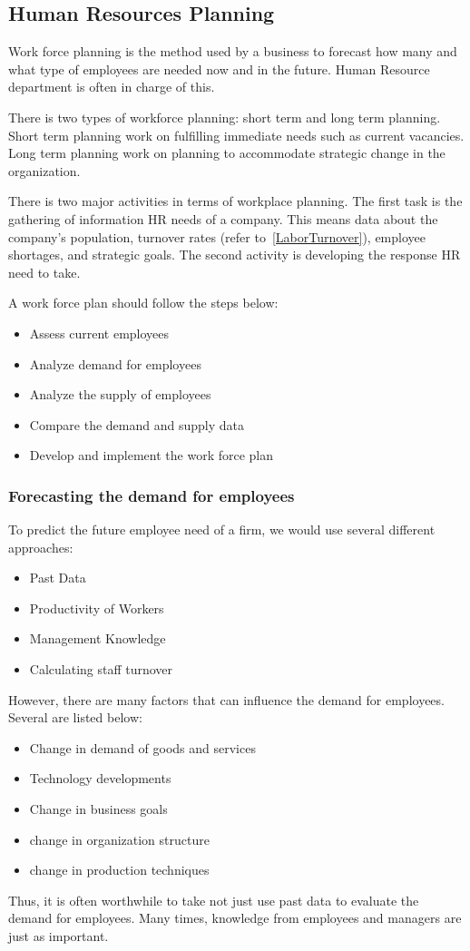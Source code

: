 \documentclass{standalone}
\begin{document}
\subsection{Human Resources Planning}
Work force planning is the method used by a business to forecast how many and what type of employees are needed now and in the future.
Human Resource department is often in charge of this. 

There is two types of workforce planning: short term and long term planning.
Short term planning work on fulfilling immediate needs such as current vacancies.
Long term planning work on planning to accommodate strategic change in the organization.

There is two major activities in terms of workplace planning.
The first task is the gathering of information HR needs of a company. 
This means data about the company's population, turnover rates (refer to~\ref{LaborTurnover}), employee shortages, and strategic goals.  The second activity is developing the response HR need to take.

A work force plan should follow the steps below:
\begin{itemize}
	\item Assess current employees
	\item Analyze demand for employees
	\item Analyze the supply of employees
	\item Compare the demand and supply data
	\item Develop and implement the work force plan
\end{itemize}

\subsubsection{Forecasting the demand for employees}
To predict the future employee need of a firm, we would use several different approaches:
\begin{itemize}
	\item Past Data
	\item Productivity of Workers
	\item Management Knowledge
	\item Calculating staff turnover
\end{itemize}

However, there are many factors that can influence the demand for employees.
Several are listed below:
\begin{itemize}
	\item Change in demand of goods and services
	\item Technology developments
	\item Change in business goals
	\item change in organization structure
	\item change in production techniques
\end{itemize}
Thus, it is often worthwhile to take not just use past data to evaluate the demand for employees.
Many times, knowledge from employees and managers are just as important.
\end{document}
